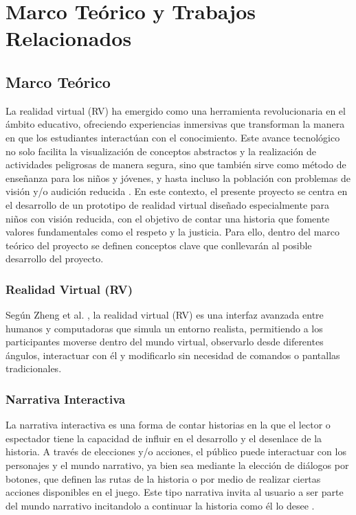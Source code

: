 \chapter{Marco Teórico y Trabajos Relacionados}

\section{Marco Teórico}

La realidad virtual (RV) ha emergido como una herramienta revolucionaria en el ámbito educativo,
 ofreciendo experiencias inmersivas que transforman la manera en que los estudiantes interactúan 
 con el conocimiento. Este avance tecnológico no solo facilita la visualización de conceptos abstractos 
 y la realización de actividades peligrosas de manera segura, sino que también sirve como método de enseñanza 
 para los niños y jóvenes, y hasta incluso la población con problemas de visión y/o audición reducida \cite{9}. 
 En este contexto, el presente proyecto se centra en el desarrollo de un prototipo de realidad virtual diseñado 
 especialmente para niños con visión reducida, con el objetivo de contar una historia que fomente valores fundamentales 
 como el respeto y la justicia. Para ello, dentro del marco teórico del proyecto se definen conceptos clave que conllevarán
  al posible desarrollo del proyecto.

\subsection{Realidad Virtual (RV)}

Según Zheng et al. \cite{8}, la realidad virtual (RV) es una interfaz avanzada entre humanos y computadoras 
que simula un entorno realista, permitiendo a los participantes moverse dentro del mundo virtual, observarlo desde 
diferentes ángulos, interactuar con él y modificarlo sin necesidad de comandos o pantallas tradicionales.

\subsection{Narrativa Interactiva}

La narrativa interactiva es una forma de contar historias en la que el lector o espectador tiene la capacidad de 
influir en el desarrollo y el desenlace de la historia. A través de elecciones y/o acciones, el público puede 
interactuar con los personajes y el mundo narrativo, ya bien sea mediante la elección de diálogos por botones, que 
definen las rutas de la historia o por medio de realizar ciertas acciones disponibles en el juego. Este tipo narrativa 
invita al usuario a ser parte del mundo narrativo incitandolo a continuar la historia como él lo desee \cite{10}.

